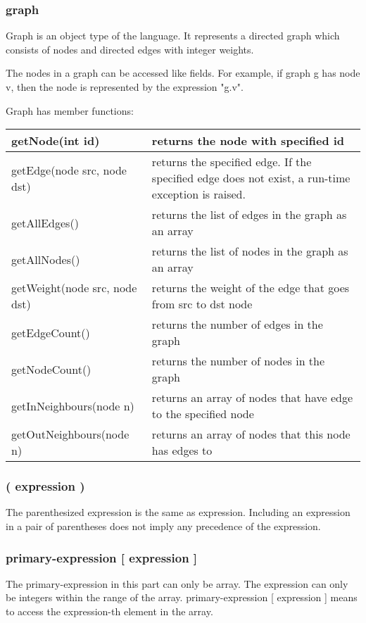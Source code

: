 \documentclass[a4paper,12pt]{article}
\begin{document}
\subsubsection{graph}
Graph is an object type of the language. It represents a directed graph which consists of nodes and directed edges with integer weights. 

The nodes in a graph can be accessed like fields. For example, if graph g has node v, then the node is represented by the expression "g.v".

Graph has member functions:
\begin{center}
\begin{tabular}{| l | p{10cm} |}
\hline
	getNode(int id)	&	returns the node with specified id \\ \hline
	getEdge(node src, node dst)	&	returns the specified edge. If the specified edge does not exist, a run-time exception is raised.\\ \hline
	getAllEdges()	&	returns the list of edges in the graph as an array\\ \hline
	getAllNodes()	&	returns the list of nodes in the graph as an array\\ \hline
	getWeight(node src, node dst) 	&	returns the weight of the edge that goes from src to dst node \\ \hline
	getEdgeCount() 	&  returns the number of edges in the graph \\ \hline
	getNodeCount()	&  returns the number of nodes in the graph \\  \hline
	getInNeighbours(node n)	&	returns an array of nodes that have edge to the specified node \\ \hline
	getOutNeighbours(node n) &	returns an array of nodes that this node has edges to \\ \hline

	
\end{tabular}
\end{center}

\subsubsection{( expression )}
The parenthesized expression is the same as expression. Including an expression in a pair of parentheses does not imply any precedence of the expression.

\subsubsection{primary-expression {[} expression {]} }
The primary-expression in this part can only be array. The expression can only be integers within the range of the array. primary-expression [ expression ] means to access the expression-th element in the array.
\end{document}
